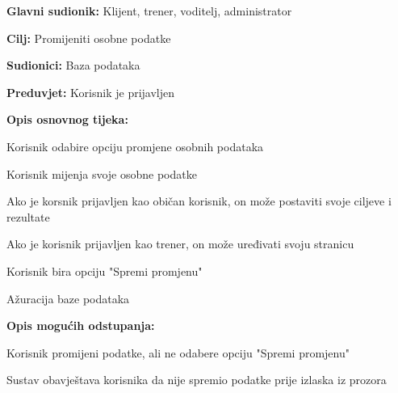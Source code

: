 					
					\noindent {}
					\begin{packed_item}
	
						\item \textbf{Glavni sudionik: }Klijent, trener, voditelj, administrator
						\item  \textbf{Cilj:} Promijeniti osobne podatke
						\item  \textbf{Sudionici:} Baza podataka
						\item  \textbf{Preduvjet:} Korisnik je prijavljen
						\item  \textbf{Opis osnovnog tijeka:}
						
						\item[] \begin{packed_enum}
	
							\item Korisnik odabire opciju promjene osobnih podataka
							\item Korisnik mijenja svoje osobne podatke
							\begin{packed_item}
	
							\item Ako je korsnik prijavljen kao običan korisnik, on može postaviti svoje ciljeve i rezultate
							\item Ako je korisnik prijavljen kao trener, on može uređivati svoju stranicu
						\end{packed_item}
							\item Korisnik bira opciju "Spremi promjenu"
							\item Ažuracija baze podataka
						\end{packed_enum}
					
						\item  \textbf{Opis mogućih odstupanja:}
						
						\item[] \begin{packed_item}
	
							\item[-]
						Korisnik promijeni podatke, ali ne odabere opciju "Spremi promjenu"
							\item[] \begin{packed_enum}
								
								\item Sustav obavještava korisnika da nije spremio podatke prije izlaska iz prozora
							\end{packed_enum}
						\end{packed_item}
					\end{packed_item}
					
